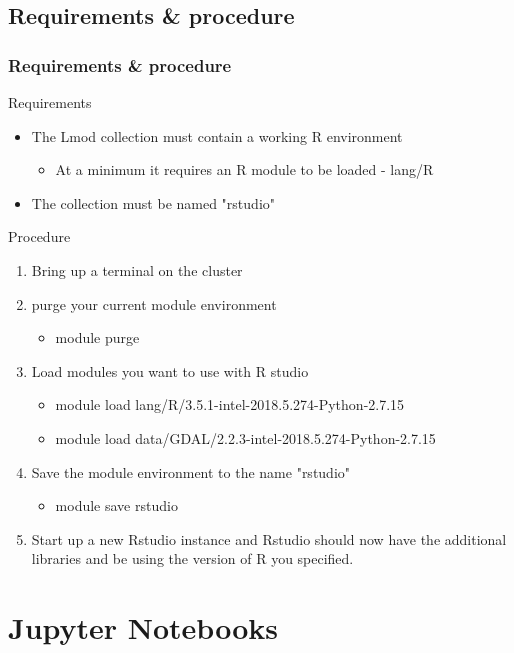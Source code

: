 \subsection[rstudioenv]{Requirements \& procedure}
\begin{frame}
	\frametitle{Requirements \& procedure}
	\begin{block}{Requirements}
		\begin{itemize}
			\item The Lmod collection must contain a working R environment
				\begin{itemize}
					\item At a minimum it requires an R module to be loaded - lang/R
				\end{itemize}
			\item The collection must be named "rstudio"
		\end{itemize}
	\end{block}
	\begin{block}{Procedure}
		\begin{enumerate}
			\item Bring up a terminal on the cluster
			\item purge your current module environment
				\begin{itemize}
				\item module purge
				\end{itemize}
			\item Load modules you want to use with R studio
				\begin{itemize}
				\item module load lang/R/3.5.1-intel-2018.5.274-Python-2.7.15 
				\item module load data/GDAL/2.2.3-intel-2018.5.274-Python-2.7.15
				\end{itemize}
			\item Save the module environment to the name "rstudio"
				\begin{itemize}
				\item module save rstudio
				\end{itemize}
			\item Start up a new Rstudio instance and Rstudio should now have the additional libraries and be using the version of R you specified.
		\end{enumerate}
	\end{block}
\end{frame}


\section[Jupyternote]{Jupyter Notebooks}
